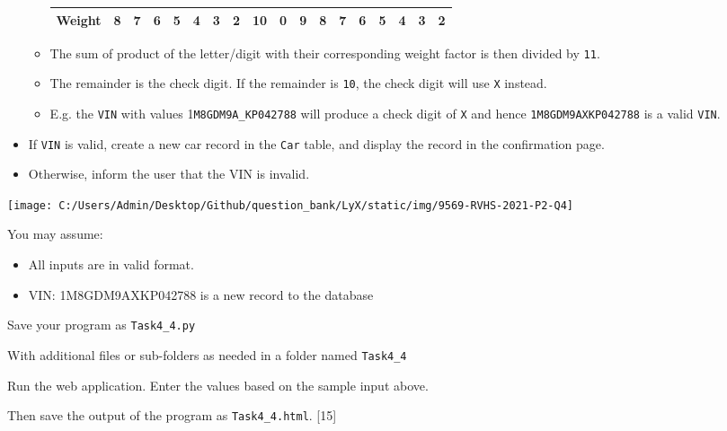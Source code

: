 \begin{itemize}
\begin{itemize}
\begin{center}
\begin{tabular}{|c|c|c|c|c|c|c|c|c|c|c|c|c|c|c|c|c|c|}
\hline 
Weight  & 8  & 7  & 6  & 5  & 4  & 3  & 2  & 10  & 0  & 9  & 8  & 7  & 6  & 5 & 4 & 3 & 2\tabularnewline
\hline 
\end{tabular}
\par\end{center}
\item The sum of product of the letter/digit with their corresponding weight
factor is then divided by \texttt{11}. 
\item The remainder is the check digit. If the remainder is \texttt{10},
the check digit will use \texttt{X} instead. 
\item E.g. the \texttt{VIN} with values 1\texttt{M8GDM9A\_KP042788} will
produce a check digit of \texttt{X} and hence \texttt{1M8GDM9AXKP042788}
is a valid \texttt{VIN}. 
\end{itemize}
\item If \texttt{VIN} is valid, create a new car record in the \texttt{Car}
table, and display the record in the confirmation page. 
\item Otherwise, inform the user that the VIN is invalid. 
\end{itemize}
\begin{center}
\texttt{[image: C:/Users/Admin/Desktop/Github/question\_bank/LyX/static/img/9569-RVHS-2021-P2-Q4]}
\par\end{center}

You may assume: 
\begin{itemize}
\item All inputs are in valid format. 
\item VIN: 1M8GDM9AXKP042788 is a new record to the database 
\end{itemize}
Save your program as \texttt{Task4\_4.py }

With additional files or sub-folders as needed in a folder named \texttt{Task4\_4 }

Run the web application. Enter the values based on the sample input
above. 

Then save the output of the program as \texttt{Task4\_4.html}. \hfill{}{[}15{]}